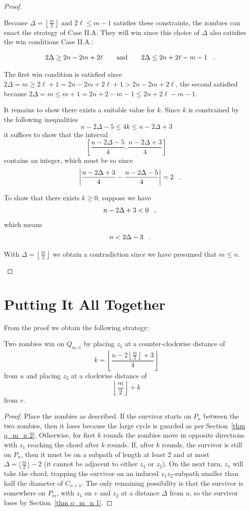 \begin{proof}
\begin{proofpart}
Because $\Delta  = \left\lfloor \frac{m}{2} \right\rfloor$ and $2 \ell \leq m -1$ satisfies these constraints, the zombies can enact the strategy of Case II.A. They will win since this choice of $\Delta$ also satisfies the win conditions Case II.A.:

\[ 2 \Delta \geq 2n - 2m + 2\ell \qquad \text{and} \qquad 2 \Delta \leq 2n + 2\ell - m - 1 \mperiod \]

The first win condition is satisfied since $2\Delta = m \geq 2\ell +1 = 2n - 2m +2\ell +1 > 2n-2m+2\ell$, the second satisfied because $2 \Delta =m \leq m + 1 = 2n+2 -m -1 \leq 2n + 2\ell - m - 1$.

It remains to show there exists a suitable value for $k$. Since $k$ is constrained by the following inequalities
\[ n - 2\Delta -5 \leq 4k \leq n-2\Delta +3 \]
it suffices to show that the interval
\[ [ \frac{n-2\Delta -5}{4}, \frac{n-2\Delta+3}{4}] \]
contains an integer, which must be so since
\[ \left\lvert \frac{n-2\Delta+3}{4} - \frac{n-2\Delta -5}{4} \right\rvert = 2 \mperiod \]

To show that there exists $k \geq 0$, suppose we have
\[ n- 2\Delta +3 < 0 \mcomma \]
which means
\[ n < 2\Delta -3 \mperiod \]

With $\Delta = \left\lfloor \frac{m}{2} \right\rfloor$ we obtain a contradiction since we have presumed that $m \leq n$.

\end{proofpart}
\end{proof}

\section{Putting It All Together}\label{thm q_m_n 4}
From the proof we obtain the following strategy:
\begin{corollary}
  Two zombies win on $Q_{m,n}$ by placing $z_1$ at a counter-clockwise distance of
  \[ k = \left\lfloor \frac{n - 2 \left\lfloor\frac{m}{2}\right\rfloor +3}{4} \right\rfloor \]
  from $u$ and placing $z_2$ at a clockwise distance of
  \[ \left\lfloor \frac{m}{2} \right\rfloor + k \]
  from $v$.
\end{corollary}
\begin{proof}
  Place the zombies as described.
  If the survivor starts on $P_n$ between the two zombies, then it loses because the large cycle is guarded as per Section~\ref{thm q_m_n 2}.
  Otherwise, for first $k$ rounds the zombies move in opposite directions with $z_1$ reaching the chord after $k$ rounds.
  If, after $k$ rounds, the survivor is still on $P_n$, then it must be on a subpath of length at least 2 and at most $\Delta = \lfloor \frac{m}{2} \rfloor - 2$ (it cannot be adjacent to either $z_1$ or $z_2$). On the next turn, $z_1$ will take the chord, trapping the survivor on an induced $z_1z_2$-subpath smaller than half the diameter of $C_{n+1}$.
  The only remaining possibility is that the survivor is somewhere on $P_m$, with $z_1$ on $v$ and $z_2$ at a distance $\Delta$ from $u$, so the survivor loses by Section~\ref{thm q_m_n 1}.
\end{proof}
